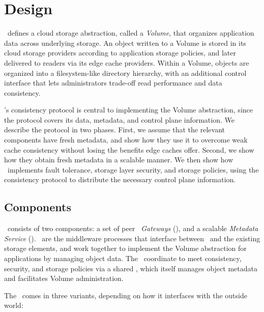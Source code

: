 \section{Design}
\label{sec:design}

\Syndicate\ defines a cloud storage abstraction, called a
{\it Volume}, that organizes application data across underlying storage.
An object written to a Volume is stored in its
cloud storage providers according to application storage policies, and
later delivered to readers via its edge cache providers.
Within a Volume, objects are organized into a filesystem-like directory
hierarchy, with an additional
control interface that lets administrators trade-off read
performance and data consistency.

\Syndicate's consistency protocol is central to 
implementing the Volume abstraction, since the protocol
covers its data, metadata, and control plane information.  We
describe the protocol in two phases.
First, we assume that the relevant components have 
fresh metadata, and show how they use it to overcome weak cache consistency
without losing the benefits edge caches offer.  Second, we show how 
they obtain fresh metadata in a scalable manner.  We then
show how \Syndicate\ implements fault tolerance,
storage layer security, and storage policies, using the
consistency protocol to distribute the necessary control plane information.

\subsection{Components}

\Syndicate\ consists of two components: a set of peer {\it \Syndicate\
  Gateways} (\SG), and a scalable {\it Metadata Service} (\MS).  \SGs\
are the middleware processes that interface between \Syndicate\ and
the existing storage elements, and work together to implement the
Volume abstraction for applications by managing object data.
The \SGs\ coordinate to meet consistency, security, and 
storage policies via a shared \MS, 
which itself manages object metadata and facilitates Volume administration.

The \SG\ comes in three variants, depending on how it interfaces with
the outside world:

